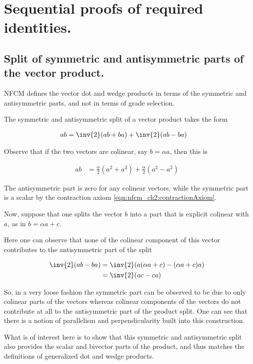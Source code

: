 \section{Sequential proofs of required identities. }

\subsection{Split of symmetric and antisymmetric parts of the vector product. }

NFCM defines the vector dot and wedge products in terms of the symmetric and antisymmetric parts, and not in terms of grade
selection.

The symmetric and antisymmetric split of a vector product takes the form

\begin{align*}
a b &= \inv{2}(a b + b a) + \inv{2}(a b - b a)
\end{align*}

Observe that if the two vectors are colinear, say $b = \alpha a$, then this is

\begin{align*}
a b &= \frac{\alpha}{2} (a^2 + a^2) + \frac{\alpha}{2}(a^2 - a^2 )
\end{align*}

The antisymmetric part is zero for any colinear vectors, while the symmetric part is a scalar by the contraction axiom \ref{eqn:nfcm_ch2:contractionAxiom}.

Now, suppose that one splits the vector $b$ into a part that is explicit
colinear with $a$, as in $b = \alpha a + c$.

Here one can observe that none of the colinear component of this vector
contributes to the antisymmetric part of the split

\begin{align*}
\inv{2}(a b - b a) &= \inv{2}(a (\alpha a + c) - (\alpha a + c) a) \\
&= \inv{2}(a c - c a) 
\end{align*}

So, in a very loose fashion the symmetric part can be observed to be
due to only colinear parts of the vectors whereas colinear components of the 
vectors do not contribute at all to the antisymmetric part of the product split.
One can see that there is a notion of parallelism and perpendicularity built
into this construction.

What is of interest here is to show that this symmetric and antisymmetric split
also provides the scalar and bivector parts of the product, and thus matches the
definitions of generalized dot and wedge products.

